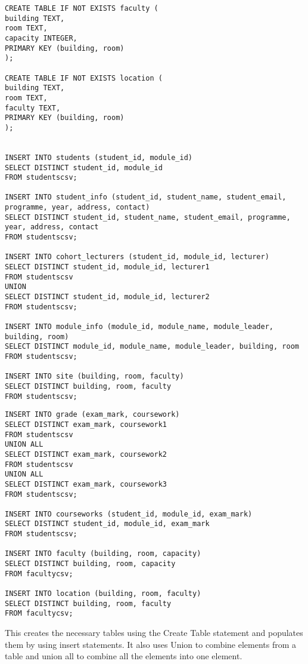 \documentclass[12pt]{article}
\begin{document}
{{\begin{tcolorbox}
\begin{verbatim}
CREATE TABLE IF NOT EXISTS faculty (
building TEXT,
room TEXT,
capacity INTEGER,
PRIMARY KEY (building, room)
);

CREATE TABLE IF NOT EXISTS location (
building TEXT,
room TEXT,
faculty TEXT,
PRIMARY KEY (building, room)
);


INSERT INTO students (student_id, module_id)
SELECT DISTINCT student_id, module_id
FROM studentscsv;

INSERT INTO student_info (student_id, student_name, student_email, programme, year, address, contact)
SELECT DISTINCT student_id, student_name, student_email, programme, year, address, contact
FROM studentscsv;

INSERT INTO cohort_lecturers (student_id, module_id, lecturer)
SELECT DISTINCT student_id, module_id, lecturer1
FROM studentscsv
UNION
SELECT DISTINCT student_id, module_id, lecturer2
FROM studentscsv;

INSERT INTO module_info (module_id, module_name, module_leader, building, room)
SELECT DISTINCT module_id, module_name, module_leader, building, room
FROM studentscsv;

INSERT INTO site (building, room, faculty)
SELECT DISTINCT building, room, faculty
FROM studentscsv;
\end{verbatim}
\end{tcolorbox}
\begin{tcolorbox}[
    enhanced,
    attach boxed title to top left={xshift=6mm,yshift=-3mm},
    colback=lightgreen!20,
    colframe=lightgreen,
    colbacktitle=lightgreen,
    title=Linux shell,
    fonttitle=\bfseries\color{black},
    boxed title style={size=small,colframe=lightgreen,sharp corners},
    sharp corners,
]
\begin{verbatim}
INSERT INTO grade (exam_mark, coursework)
SELECT DISTINCT exam_mark, coursework1
FROM studentscsv
UNION ALL
SELECT DISTINCT exam_mark, coursework2
FROM studentscsv
UNION ALL
SELECT DISTINCT exam_mark, coursework3
FROM studentscsv;

INSERT INTO courseworks (student_id, module_id, exam_mark)
SELECT DISTINCT student_id, module_id, exam_mark
FROM studentscsv;

INSERT INTO faculty (building, room, capacity)
SELECT DISTINCT building, room, capacity
FROM facultycsv;

INSERT INTO location (building, room, faculty)
SELECT DISTINCT building, room, faculty
FROM facultycsv;
\end{verbatim}
\end{tcolorbox}
This creates the necessary tables using the Create Table statement and populates them by using insert statements. It also uses Union to combine elements from a table and union all to combine all the elements into one element.
}}
\end{document}
